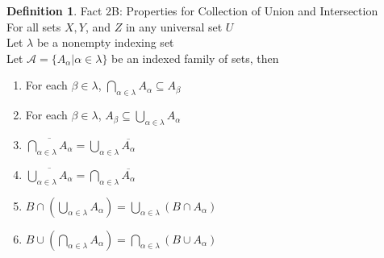 \documentclass{book}
\theoremstyle{definition}
\newtheorem{definition}{Definition}[section]
\theoremstyle{remark}
\begin{document}
\begin{definition}
Fact 2B: Properties for Collection of Union and Intersection \\

For all sets $X, Y$, and $Z$ in any universal set $U$ \\
Let $\lambda$ be a nonempty indexing set \\
Let $\mathcal{A} = \{ A_{\alpha} | \alpha \in \lambda \}$ be an indexed family of sets, then 
    
    \begin{enumerate}
        \item For each $\beta \in \lambda$, $\bigcap_{\alpha \in \lambda}{A_{\alpha}} \subseteq A_{\beta}$ 
        \item For each $\beta \in \lambda$, $A_{\beta} \subseteq \bigcup_{\alpha \in \lambda}{A_{\alpha}}$ 
        \item $\overline{\bigcap_{\alpha \in \lambda}{A_{\alpha}}} = \bigcup_{\alpha \in \lambda}{ \overline{A_{\alpha}}}$
        \item $\overline{\bigcup_{\alpha \in \lambda}{A_{\alpha}}} = \bigcap_{\alpha \in \lambda}{ \overline{A_{\alpha}}}$
        \item $B \cap \left (\bigcup_{\alpha \in \lambda}{A_{\alpha}} \right ) = \bigcup_{\alpha \in \lambda}{(B \cap A_{\alpha})}$
        \item $B \cup \left ( \bigcap_{\alpha \in \lambda}{A_{\alpha}} \right ) = \bigcap_{\alpha \in \lambda}{(B \cup A_{\alpha})}$
    \end{enumerate}
\end{definition}
\end{document}
